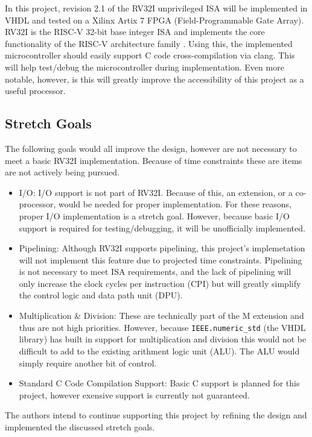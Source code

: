 \documentclass[lettersize,journal]{IEEEtran}
\begin{document}
In this project, revision 2.1 of the RV32I unprivileged ISA will be implemented in VHDL and tested on a Xilinx Artix 7 FPGA (Field-Programmable Gate Array). 
RV32I is the RISC-V 32-bit base integer ISA and implements the core functionality of the RISC-V architecture family \cite{riscvunprovisioned}.
Using this, the implemented microcontroller should easily support C code cross-compilation via clang.
This will help test/debug the microcontroller during implementation.
Even more notable, however, is this will greatly improve the accessibility of this project as a useful processor.

\subsection{Stretch Goals}
The following goals would all improve the design, however are not necessary to meet a basic RV32I implementation.
Because of time constraints these are items are not actively being pursued.
\begin{itemize}
    \item I/O: I/O support is not part of RV32I. Because of this, an extension, or a co-processor, would be needed for proper implementation.
        For these reasons, proper I/O implementation is a stretch goal. However, because basic I/O support is required for testing/debugging, it will be unofficially
        implemented.
    \item Pipelining: Although RV32I supports pipelining, this project's implemetation will not implement this feature due to projected time constraints.
        Pipelining is not necessary to meet ISA requirements, and the lack of pipelining will only increase the clock cycles per instruction (CPI) but will greatly
        simplify the control logic and data path unit (DPU).
    \item Multiplication \& Division: These are technically part of the M extension \cite{riscvunprovisioned} and thus are not high priorities.
        However, because \verb|IEEE.numeric_std| (the VHDL library) has built in support for multiplication and division this would not be difficult to add to
        the existing arithment logic unit (ALU). The ALU would simply require another bit of control.
    \item Standard C Code Compilation Support: Basic C support is planned for this project, however exensive support is currently not guaranteed.
\end{itemize}
The authors intend to continue supporting this project by refining the design and implemented the discussed stretch goals.
 
\end{document}
